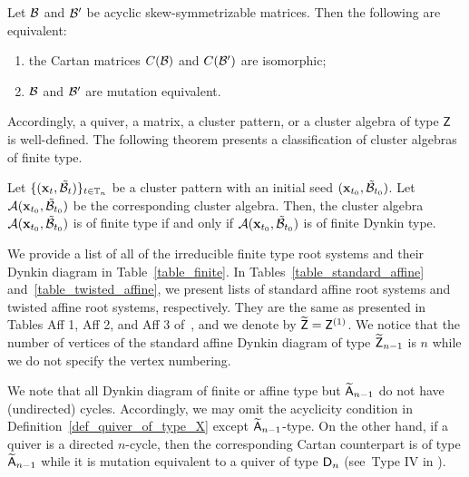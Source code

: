 \begin{proposition}\label{prop_quiver_of_same_type_are_mutation_equivalent}
Let $\mathcal{B}$ and $\mathcal{B}'$ be acyclic skew-symmetrizable matrices. Then the following are equivalent:
\begin{enumerate}
\item the Cartan matrices $C(\mathcal{B})$ and $C(\mathcal{B}')$ are isomorphic;
\item $\mathcal{B}$ and $\mathcal{B}'$ are mutation equivalent.
\end{enumerate}
\end{proposition}
Accordingly, a quiver, a matrix, a cluster pattern, or a cluster algebra of type $\mathsf{Z}$ is well-defined. 
The following
theorem presents a classification of cluster algebras of finite type.
\begin{theorem}[{\cite{FZ2_2003}}] \label{thm_FZ_finite_type}
	Let $\{ (\mathbf{x}_t, \mathcal{\tilde{B}}_t)\}_{t \in \mathbb{T}_n}$ be a
	cluster pattern with an initial seed $(\mathbf{x}_{t_0},
	\mathcal{\tilde{B}}_{t_0})$. Let $\mathcal{A}(\mathbf{x}_{t_0}, \mathcal{\tilde{B}}_{t_0})$ be the corresponding
	cluster algebra. Then, the cluster algebra $\mathcal{A}(\mathbf{x}_{t_0}, \mathcal{\tilde{B}}_{t_0})$ is of finite type if and only if $\mathcal{A}(\mathbf{x}_{t_0}, \mathcal{\tilde{B}}_{t_0})$ is of finite Dynkin type.
\end{theorem}



We provide a list of all of the irreducible finite type root systems and their Dynkin diagram in Table~\ref{table_finite}.
In Tables~\ref{table_standard_affine} and~\ref{table_twisted_affine}, we present lists of standard affine root 
systems and twisted affine root systems, respectively. They are the same as 
presented in Tables Aff 1, Aff 2, and Aff 3 of~\cite[Chapter~4]{Kac83}, and we 
denote by $\widetilde{\mathsf{Z}} = \mathsf{Z}^{(1)}$. 
We notice that the number of vertices of the standard affine Dynkin diagram of type $\widetilde{\mathsf{Z}}_{n-1}$ is $n$ while we do not specify the vertex numbering. 

We note that all Dynkin diagram of finite or affine type but $\widetilde{\mathsf{A}}_{n-1}$ do not have (undirected) cycles. Accordingly, we may omit the acyclicity condition in Definition~\ref{def_quiver_of_type_X} except $\widetilde{\mathsf{A}}_{n-1}$-type. 
On the other hand, if a quiver is a directed $n$-cycle, then the corresponding Cartan counterpart is of type $\widetilde{\mathsf{A}}_{n-1}$ while it is mutation equivalent to a quiver of type $\mathsf{D}_n$ (see~Type IV in \cite{Vatne10}). 

